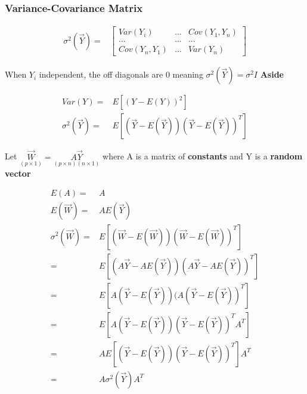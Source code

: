 \documentclass[11pt]{article}
\begin{document}
\subsubsection{Variance-Covariance Matrix}
\label{sec:org918ed33}

\begin{equation}
\begin{split}
\sigma^2(\vec{Y}) = & \begin{bmatrix}
Var(Y_i) & ... & Cov(Y_1, Y_n)\\
... & ... & ...\\
Cov(Y_n, Y_1) & ... & Var(Y_n)
\end{bmatrix}
\end{split}
\end{equation}

When \(Y_i\) independent, the off diagonals are 0 meaning \(\sigma^2(\vec{Y}) =
\sigma^2 I\)
\textbf{Aside}

\begin{equation}
\begin{split}
Var(Y) = & E[ (Y - E(Y))^2 ]\\
\sigma^2(\vec{Y}) = & E [ (\vec{Y} - E(\vec{Y}))(\vec{Y} - E(\vec{Y}))^T ]
\end{split}
\end{equation}

Let \(\underset{(p \times 1)}{\vec{W}} = \underset{(p \times n)(n \times 1)}{A
\vec{Y}}\) where A is a matrix of \textbf{constants} and Y is a \textbf{random vector}

\begin{equation}
\begin{split}
E(A) = & A\\
E(\vec{W}) = & AE(\vec{Y})\\
\sigma^2(\vec{W}) = & E[ (\vec{W} - E(\vec{W}))(\vec{W} - E(\vec{W}))^T ]\\
= & E[ (A \vec{Y} - AE(\vec{Y}))(A \vec{Y} - A E(\vec{Y}))^T ]\\
= & E[ A(\vec{Y} - E(\vec{Y}))(A(\vec{Y} - E(\vec{Y}))^T ]\\
= & E[ A(\vec{Y} - E(\vec{Y}))(\vec{Y} - E(\vec{Y}))^T A^T]\\
= & A E[ (\vec{Y} - E(\vec{Y}))(\vec{Y} - E(\vec{Y}))^T ] A^T\\
= & A \sigma^2(\vec{Y}) A^T
\end{split}
\end{equation}
\end{document}
